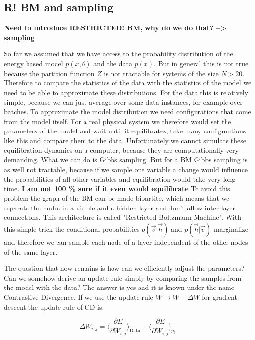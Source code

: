 \documentclass[nofootinbib, superscriptaddress, prl]{revtex4}
\begin{document}
\subsection{R! BM and sampling}

 \textbf{Need to introduce RESTRICTED! BM, why do we do that? --> sampling}

So far we assumed that we have access to the probability distribution of the energy based model $p(x, \theta)$ and the data $p(x)$. But in general this is not true because the partition function $Z$ is not tractable for systems of the size $N>20$. Therefore to compare the statistics of the data with the statistics of the model we need to be able to approximate these distributions. For the data this is relatively simple, because we can just average over some data instances, for example over batches. To approximate the model distribution we need configurations that come from the model itself. For a real physical system we therefore would set the parameters of the model and wait until it equilibrates, take many configurations like this and compare them to the data. 
Unfortunately we cannot simulate these equilibration dynamics on a computer, because they are computationally very demanding. What we can do is Gibbs sampling. But for a BM Gibbs sampling is as well not tractable, because if we sample one variable a change would influence the probabilities of all other variables and equilibration would take very long time. \textbf{I am not 100 \% sure if it even would equilibrate} To avoid this problem the graph of the BM can be made bipartite, which means that we separate the nodes in a visible and a hidden layer and don't allow inter-layer connections. This architecture is called "Restricted Boltzmann Machine". With this simple trick the conditional probabilities $p(\vec{v}|\vec{h})$ and $p(\vec{h}|\vec{v})$ marginalize and therefore we can sample each node of a layer independent of the other nodes of the same layer. 

The question that now remains is how can we efficiently adjust the parameters? Can we somehow derive an update rule simply by comparing the samples from the model with the data? The answer is yes and it is known under the name Contrastive Divergence. If we use the update rule $W \rightarrow W - \Delta W$ for gradient descent the update rule of CD is:

\begin{equation*}
	\Delta W_{i,j} = \langle \frac{ \partial E}{\partial W_{i,j}} \rangle_{\text{Data}} - \langle \frac{\partial E}{\partial W_{i,j}} \rangle_{p_{\theta}} %
\end{equation*}
\end{document}

